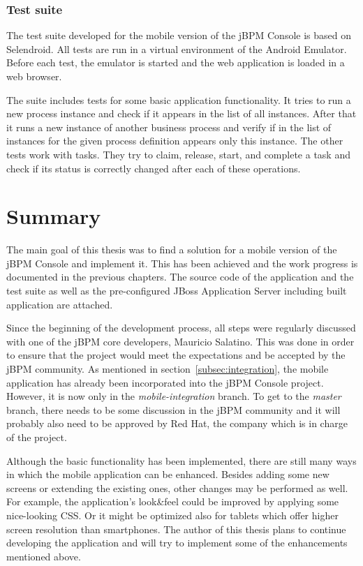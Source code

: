 \documentclass[12pt,oneside,final]{fithesis2}
\begin{document}
\subsection{Test suite}
\label{subsec:test-suite}
The test suite developed for the mobile version of the jBPM Console is based on Selendroid.
All tests are run in a virtual environment of the Android Emulator.
Before each test, the emulator is started and the web application is loaded in a web browser.

The suite includes tests for some basic application functionality.
It tries to run a new process instance and check if it appears in the list of all instances.
After that it runs a new instance of another business process and verify if in the list of instances for the given process definition appears only this instance.
The other tests work with tasks.
They try to claim, release, start, and complete a task and check if its status is correctly changed after each of these operations.

\chapter{Summary}
The main goal of this thesis was to find a solution for a mobile version of the jBPM Console and implement it.
This has been achieved and the work progress is documented in the previous chapters.
The source code of the application and the test suite as well as the pre-configured JBoss Application Server including built application are attached.

Since the beginning of the development process, all steps were regularly discussed with one of the jBPM core developers, Mauricio Salatino.
This was done in order to ensure that the project would meet the expectations and be accepted by the jBPM community.
As mentioned in section~\ref{subsec:integration}, the mobile application has already been incorporated into the jBPM Console project.
However, it is now only in the \emph{mobile-integration} branch.
To get to the \emph{master} branch, there needs to be some discussion in the jBPM community and it will probably also need to be approved by Red Hat, the company which is in charge of the project.

Although the basic functionality has been implemented, there are still many ways in which the mobile application can be enhanced.
Besides adding some new screens or extending the existing ones, other changes may be performed as well.
For example, the application's look\&feel could be improved by applying some nice-looking CSS.
Or it might be optimized also for tablets which offer higher screen resolution than smartphones.
The author of this thesis plans to continue developing the application and will try to implement some of the enhancements mentioned above.
\end{document}
